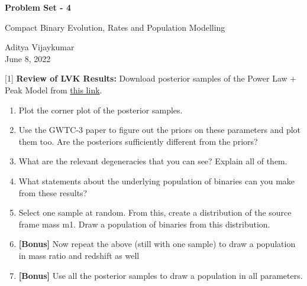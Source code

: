 \documentclass{article} %
\newcommand{\question}[2][]{\begin{flushleft}
        \textbf{Problem #1}: %
\end{flushleft}
}
\newcommand{\maketitletwo}[2][]{\begin{center}
        \Large{\textbf{Problem Set - 4}
            
            Compact Binary Evolution, Rates and Population Modelling} %
        \vspace{10pt}
        
        \normalsize{Aditya Vijaykumar  %
        } \\
        \vspace{5pt}  June 8, 2022     %
        \vspace{15pt}
        
\end{center}}
\begin{document}
    \maketitletwo[5]  %
    
    \question[1]{} \textbf{Review of LVK Results:} 
    Download posterior samples of the Power Law + Peak Model from \href{https://drive.google.com/drive/folders/1lBTo12EoWYjvR0Bf76PSy6tP2ms6nt41?usp=sharing}{this link}.
    \begin{enumerate}
    \item Plot the corner plot of the posterior samples. 
    
    \item Use the GWTC-3 paper to figure out the priors on these parameters and plot them too. Are the posteriors sufficiently different from the priors?
    
    \item What are the relevant degeneracies that you can see? Explain all of them.
    
    
    \item What statements about the underlying population of binaries can you make from these results?
    \item Select one sample at random. From this, create a distribution of the source frame mass m1. Draw a population of binaries from this distribution.
    \item \textbf{[Bonus]} Now repeat the above (still with one sample) to draw a population in mass ratio and redshift as well
    \item \textbf{[Bonus]} Use all the posterior samples to draw a population in all parameters.
\end{enumerate}
\end{document}
